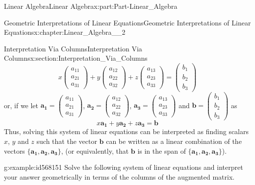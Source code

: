 \documentclass[oneside,10pt,]{book}
\numberwithin{equation}{section}
\begin{document}
\begin{partptx}{Linear Algebra}{}{Linear Algebra}{}{}{x:part:Part-Linear_Algebra}
\begin{chapterptx}{Geometric Interpretations of Linear Equations}{}{Geometric Interpretations of Linear Equations}{}{}{x:chapter:Linear_Algebra__2}
\begin{sectionptx}{Interpretation Via Columns}{}{Interpretation Via Columns}{}{}{x:section:Interpretation_Via_Columns}
\begin{equation*}
x \begin{pmatrix} a_{11} \\ a_{21} \\ a_{31} \end{pmatrix} +y\begin{pmatrix} a_{12} \\ a_{22} \\ a_{32} \end{pmatrix} +z\begin{pmatrix} a_{13} \\ a_{23} \\ a_{33} \end{pmatrix} =\begin{pmatrix} b_{1} \\ b_{2} \\ b_{3} \end{pmatrix}
\end{equation*}
or, if we let \(\mathbf{a_1}= \begin{pmatrix} a_{11} \\ a_{21} \\ a_{31} \end{pmatrix}\), \(\mathbf{a_2}= \begin{pmatrix} a_{12} \\ a_{22} \\ a_{32} \end{pmatrix}\), \(\mathbf{a_3}= \begin{pmatrix} a_{13} \\ a_{23} \\ a_{33} \end{pmatrix}\) and \(\mathbf{b}= \begin{pmatrix} b_{1} \\ b_{2} \\ b_{3} \end{pmatrix}\) as%
\begin{equation*}
x\mathbf{a_1}+y\mathbf{a_2}+z\mathbf{a_3}=\mathbf{b}
\end{equation*}
Thus, solving this system of linear equations can be interpreted as finding scalars \(x\), \(y\) and \(z\) such that the vector \(\mathbf{b}\) can be written as a linear combination of the vectors \(\{\mathbf{a_1, a_2, a_3}\}\), (or equivalently, that \(\mathbf{b}\) is in the span of  \(\{\mathbf{a_1, a_2, a_3}\}\)).%
\begin{example}{}{g:example:id568151}%
Solve the following system of linear equations and interpret your answer geometrically in terms of the columns of the augmented matrix.%
\begin{align*}

\end{align*}
\end{example}
\end{sectionptx}
\end{chapterptx}
\end{partptx}
\end{document}

